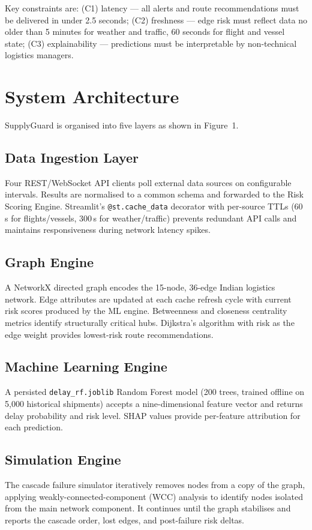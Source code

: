\documentclass[conference]{IEEEtran}
\begin{document}
Key constraints are: (C1) latency — all alerts and route
recommendations must be delivered in under 2.5 seconds; (C2)
freshness — edge risk must reflect data no older than 5 minutes
for weather and traffic, 60 seconds for flight and vessel state;
(C3) explainability — predictions must be interpretable by
non-technical logistics managers.


\section{System Architecture}

SupplyGuard is organised into five layers as shown in Figure~1.

\subsection{Data Ingestion Layer}
Four REST/WebSocket API clients poll external data sources on
configurable intervals. Results are normalised to a common schema and
forwarded to the Risk Scoring Engine. Streamlit's \texttt{@st.cache\_data}
decorator with per-source TTLs (60\,s for flights/vessels,
300\,s for weather/traffic) prevents redundant API calls and
maintains responsiveness during network latency spikes.

\subsection{Graph Engine}
A NetworkX directed graph encodes the 15-node, 36-edge Indian
logistics network. Edge attributes are updated at each cache
refresh cycle with current risk scores produced by the ML engine.
Betweenness and closeness centrality metrics identify structurally
critical hubs. Dijkstra's algorithm with risk as the edge weight
provides lowest-risk route recommendations.

\subsection{Machine Learning Engine}
A persisted \texttt{delay\_rf.joblib} Random Forest model (200 trees,
trained offline on 5,000 historical shipments) accepts a
nine-dimensional feature vector and returns delay probability
and risk level. SHAP values provide per-feature attribution for
each prediction.

\subsection{Simulation Engine}
The cascade failure simulator iteratively removes nodes from a
copy of the graph, applying weakly-connected-component (WCC)
analysis to identify nodes isolated from the main network
component. It continues until the graph stabilises and reports
the cascade order, lost edges, and post-failure risk deltas.
\end{document}
